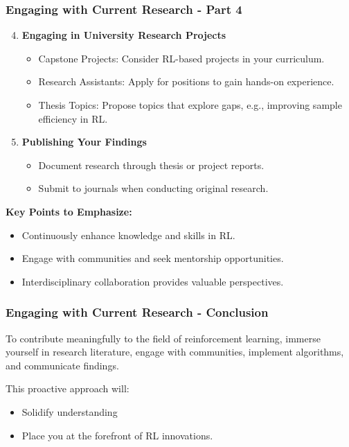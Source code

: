 \documentclass[aspectratio=169]{beamer}
\begin{document}
\begin{frame}[fragile]
    \frametitle{Engaging with Current Research - Part 4}
    
    \begin{enumerate}
        \setcounter{enumi}{3}
        \item \textbf{Engaging in University Research Projects}
        \begin{itemize}
            \item Capstone Projects: Consider RL-based projects in your curriculum.
            \item Research Assistants: Apply for positions to gain hands-on experience.
            \item Thesis Topics: Propose topics that explore gaps, e.g., improving sample efficiency in RL.
        \end{itemize}
        
        \item \textbf{Publishing Your Findings}
        \begin{itemize}
            \item Document research through thesis or project reports.
            \item Submit to journals when conducting original research.
        \end{itemize}
    \end{enumerate}
    
    \textbf{Key Points to Emphasize:}
    \begin{itemize}
        \item Continuously enhance knowledge and skills in RL.
        \item Engage with communities and seek mentorship opportunities.
        \item Interdisciplinary collaboration provides valuable perspectives.
    \end{itemize}
\end{frame}

\begin{frame}[fragile]
    \frametitle{Engaging with Current Research - Conclusion}
    
    To contribute meaningfully to the field of reinforcement learning, immerse yourself in research literature, engage with communities, implement algorithms, and communicate findings. 

    This proactive approach will:
    \begin{itemize}
        \item Solidify understanding
        \item Place you at the forefront of RL innovations.
    \end{itemize}
\end{frame}
\end{document}
